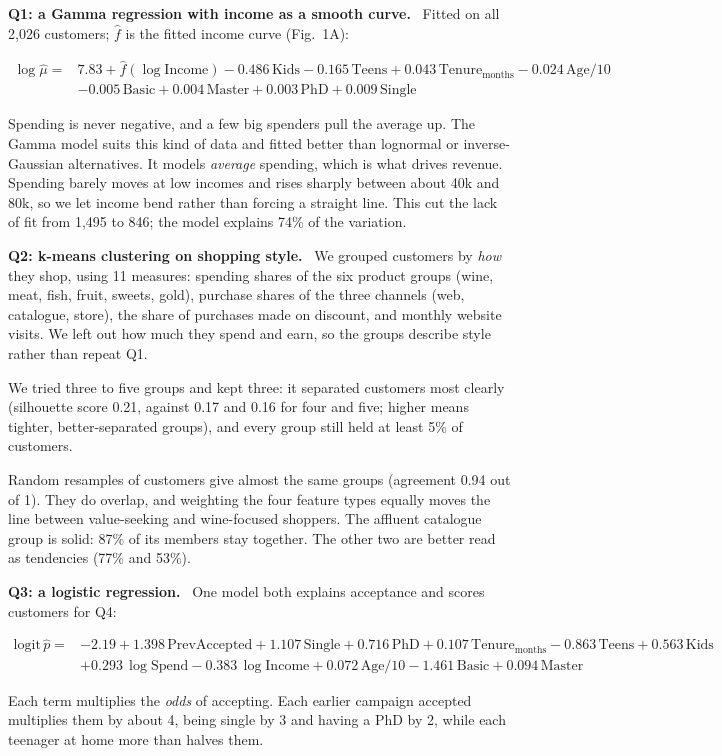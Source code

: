\documentclass[10pt,letterpaper]{article}
\newcommand{\q}[1]{\par\needspace{2\baselineskip}\textbf{#1}\ }   %
\newcommand{\eqbox}[1]{%
  \par\smallskip\noindent\colorbox{eqbg}{\parbox{\dimexpr\linewidth-2\fboxsep\relax}{\small #1}}\par\smallskip}
\newcommand{\tx}[1]{\mathrm{#1}}               %
\begin{document}
\q{Q1: a Gamma regression with income as a smooth curve.} Fitted on all 2,026 customers; $\hat f$ is the fitted income curve (Fig.~1A):
\eqbox{%
$\begin{aligned}
\log\hat\mu ={}& 7.83 + \hat f(\log \tx{Income}) - 0.486\,\tx{Kids} - 0.165\,\tx{Teens} + 0.043\,\tx{Tenure}_{\text{months}} - 0.024\,\tx{Age}/10\\
&- 0.005\,\tx{Basic} + 0.004\,\tx{Master} + 0.003\,\tx{PhD} + 0.009\,\tx{Single}
\end{aligned}$}
Spending is never negative, and a few big spenders pull the average up. The Gamma model suits this kind of data and fitted better than lognormal or inverse-Gaussian alternatives. It models \emph{average} spending, which is what drives revenue. Spending barely moves at low incomes and rises sharply between about 40k and 80k, so we let income bend rather than forcing a straight line. This cut the lack of fit from 1,495 to 846; the model explains 74\% of the variation.

\q{Q2: k-means clustering on shopping style.}
We grouped customers by \emph{how} they shop, using 11 measures: spending shares of the six product groups (wine, meat, fish, fruit, sweets, gold), purchase shares of the three channels (web, catalogue, store), the share of purchases made on discount, and monthly website visits. We left out how much they spend and earn, so the groups describe style rather than repeat Q1.

We tried three to five groups and kept three: it separated customers most clearly (silhouette score 0.21, against 0.17 and 0.16 for four and five; higher means tighter, better-separated groups), and every group still held at least 5\% of customers.

Random resamples of customers give almost the same groups (agreement 0.94 out of 1). They do overlap, and weighting the four feature types equally moves the line between value-seeking and wine-focused shoppers. The affluent catalogue group is solid: 87\% of its members stay together. The other two are better read as tendencies (77\% and 53\%).

\q{Q3: a logistic regression.} One model both explains acceptance and scores customers for Q4:
\eqbox{%
$\begin{aligned}
\tx{logit}\,\hat p ={}& -2.19 + 1.398\,\tx{PrevAccepted} + 1.107\,\tx{Single} + 0.716\,\tx{PhD} + 0.107\,\tx{Tenure}_{\text{months}} - 0.863\,\tx{Teens} + 0.563\,\tx{Kids}\\
&+ 0.293\,\log\tx{Spend} - 0.383\,\log\tx{Income} + 0.072\,\tx{Age}/10 - 1.461\,\tx{Basic} + 0.094\,\tx{Master}
\end{aligned}$}
Each term multiplies the \emph{odds} of accepting. Each earlier campaign accepted multiplies them by about 4, being single by 3 and having a PhD by 2, while each teenager at home more than halves them.
\end{document}
